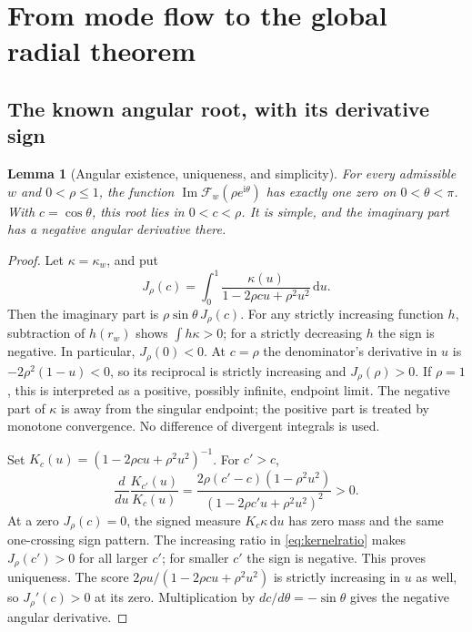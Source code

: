 \documentclass[11pt]{article}
\numberwithin{equation}{section}
\newtheorem{lemma}[theorem]{Lemma}
\theoremstyle{definition}
\theoremstyle{remark}
\DeclareMathOperator{\Imn}{Im}
\newcommand{\dd}{\,\mathrm d}
\newcommand{\ii}{\mathrm i}
\begin{document}
\section{From mode flow to the global radial theorem}
\label{sec:radial}
\subsection{The known angular root, with its derivative sign}
\begin{lemma}[Angular existence, uniqueness, and simplicity]
\label{lem:angular}
For every admissible $w$ and $0<\rho\le1$, the function
$\Imn\mathcal F_w(\rho e^{\ii\theta})$ has exactly one zero on
$0<\theta<\pi$. With $c=\cos\theta$, this root lies in $0<c<\rho$.
It is simple, and the imaginary part has a negative angular derivative
there.
\end{lemma}
\begin{proof}
Let $\kappa=\kappa_w$, and put
\begin{equation}\label{eq:J}
 J_\rho(c)=\int_0^1\frac{\kappa(u)}{1-2\rho cu+\rho^2u^2}\dd u.
\end{equation}
Then the imaginary part is $\rho\sin\theta\,J_\rho(c)$.
For any strictly increasing function $h$, subtraction of $h(r_w)$
shows $\int h\kappa>0$; for a strictly decreasing $h$ the sign is
negative. In particular, $J_\rho(0)<0$.
At $c=\rho$ the denominator's derivative in $u$ is
$-2\rho^2(1-u)<0$, so its reciprocal is strictly increasing and
$J_\rho(\rho)>0$. If $\rho=1$, this is interpreted as a positive,
possibly infinite, endpoint limit. The negative part of $\kappa$ is
away from the singular endpoint; the positive part is treated by
monotone convergence. No difference of divergent integrals is used.

Set $K_c(u)=(1-2\rho cu+\rho^2u^2)^{-1}$. For $c'>c$,
\begin{equation}\label{eq:kernelratio}
 \frac d{du}\frac{K_{c'}(u)}{K_c(u)}
 =\frac{2\rho(c'-c)(1-\rho^2u^2)}
              {(1-2\rho c'u+\rho^2u^2)^2}>0.
\end{equation}
At a zero $J_\rho(c)=0$, the signed measure $K_c\kappa\dd u$ has
zero mass and the same one-crossing sign pattern. The increasing ratio
in \eqref{eq:kernelratio} makes $J_\rho(c')>0$ for all larger $c'$;
for smaller $c'$ the sign is negative. This proves uniqueness.
The score $2\rho u/(1-2\rho cu+\rho^2u^2)$ is strictly increasing in
$u$ as well, so $J_\rho'(c)>0$ at its zero. Multiplication by
$dc/d\theta=-\sin\theta$ gives the negative angular derivative.
\end{proof}
\end{document}
